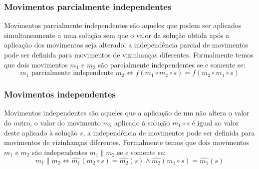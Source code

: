 \subsubsection{Movimentos parcialmente independentes} \label{subsubsec:movimentosParcialmenteIndependentes}

Movimentos parcialmente independentes são aqueles que podem ser aplicados simultaneamente a uma solução sem que o valor da solução obtida após a aplicação dos movimentos seja alterado, a independência parcial de movimentos pode ser definida para movimentos de vizinhanças diferentes.
Formalmente temos que dois movimentos $m_1$ e $m_2$ são parcialmente independentes se e somente se:
\begin{equation}
m_1 \textrm{ parcialmente independente } m_2 \iff f(m_1 \circ m_2 \circ s) = f(m_2 \circ m_1 \circ s) \label{eq:movimentosParcialmenteIndependentes}
\end{equation}

\subsubsection{Movimentos independentes} \label{subsubsec:movimentosIndependentes}

Movimentos independentes são aqueles que a aplicação de um não altera o valor do outro, o valor do movimento $m_2$ aplicado à solução $m_1 \circ s$ é igual ao valor deste aplicado à solução $s$, a independência de movimentos pode ser definida para movimentos de vizinhanças diferentes.
Formalmente temos que dois movimentos $m_1$ e $m_2$ são independentes $m_1 \parallel m_2$ se e somente se:
\begin{equation}
m_1 \parallel m_2 \iff \widehat{m_1}(m_2 \circ s) = \widehat{m_2}(s) \land \widehat{m_2}(m_1 \circ s) = \widehat{m_1}(s)
\end{equation}

